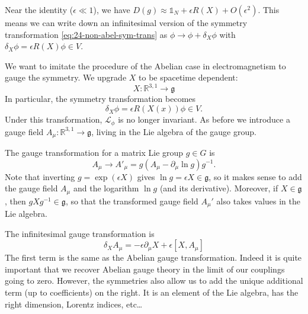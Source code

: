 Near the identity ($\epsilon \ll 1$), we have $ D(g)\approx \mathbb{1}_N + \epsilon R(X) + O(\epsilon^2)$.
This means we can write down an infinitesimal version of the symmetry transformation \eqref{eq:24-non-abel-sym-trans} as $\phi \to \phi + \delta_X \phi$ with  $\delta_X \phi = \epsilon R(X) \phi \in V$.

We want to imitate the procedure of the Abelian case in electromagnetism to gauge the symmetry. We upgrade $X$  to be spacetime dependent:
\begin{equation}
  X \colon \mathbb{R}^{3, 1} \to \mathfrak{g}
\end{equation}
In particular, the symmetry transformation becomes
\begin{equation}
  \delta_X\phi = \epsilon R(X(x)) \phi \in V.
\end{equation}
Under this transformation, $\mathcal{L}_\phi$  is no longer invariant. As before we introduce a gauge field $A_{\mu} \colon \mathbb{R}^{3, 1} \to \mathfrak{g}$, living in the Lie algebra of the gauge group.
\begin{leftbar}
  The  gauge transformation for a matrix Lie group $g \in G$ is
  \begin{equation}
    A_{\mu} \to A'_{\mu} = g (A_{\mu} - \partial_{\mu} \ln g) g^{-1}.
  \end{equation}
  Note that inverting $g = \exp(\epsilon X)$ gives $\ln g = \epsilon X \in \mathfrak{g}$, so it makes sense to add the gauge field $A_{\mu}$ and the logarithm $\ln g$ (and its derivative). Moreover, if $X \in \mathfrak{g}$, then $g X g^{-1} \in \mathfrak{g}$, so that the transformed gauge field $A_{\mu}'$ also takes values in the Lie algebra.
\end{leftbar}
The infinitesimal gauge transformation is
\begin{equation}
  \label{eq:24-gtrans}
  \delta_X A_{\mu} = - \epsilon \partial_{\mu} X + \epsilon [X, A_{\mu}]
\end{equation}
The first term is the same as the Abelian gauge transformation.
Indeed it is quite important that we recover Abelian gauge theory in the limit of our couplings going to zero.
However, the symmetries also allow us to add the unique additional term (up to coefficients) on the right.
It is an element of the Lie algebra, has the right dimension, Lorentz indices, etc\dots

